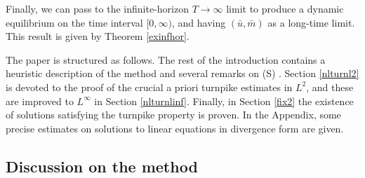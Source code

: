 \documentclass[10pt,a4paper,nouppercase,nowrite]{article}
\numberwithin{equation}{section}
\newcommand{\Sp}{{\textsc (S)} }
\theoremstyle{definition}
\begin{document}
	Finally, we can pass to the infinite-horizon $T\to\infty$ limit to produce a dynamic equilibrium on the time interval $[0,\infty)$, and having $(\bar u, \bar m)$ as a long-time limit. This result is given by Theorem \ref{exinfhor}. 
	
	\smallskip
	
	The paper is structured as follows. The rest of the introduction contains a heuristic description of the method and several remarks on \Sp. Section \ref{nlturnl2} is devoted to the proof of the crucial a priori turnpike estimates in $L^2$, and these are improved to $L^\infty$ in Section \ref{nlturnlinf}. Finally, in Section \ref{fix2} the existence of solutions satisfying the turnpike property is proven. In the Appendix, some precise estimates on solutions to linear equations in divergence form are given.
		
\subsection{Discussion on the method}\label{sdisc}
\end{document}
